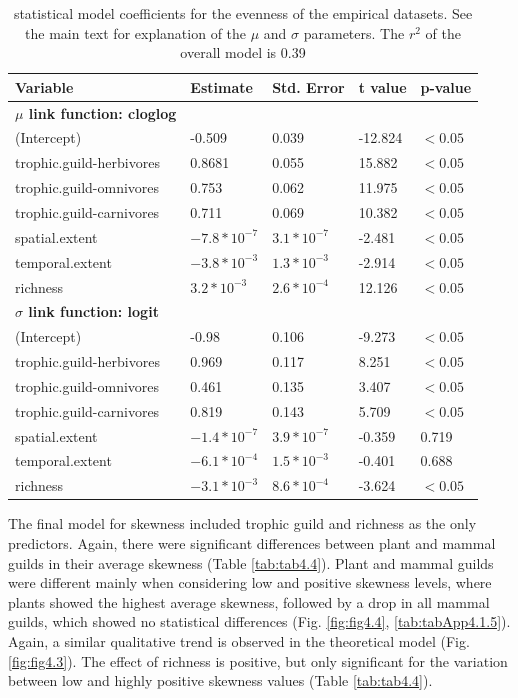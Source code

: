 \begin{table}[htbp!]
\centering
\caption[Evenness model coefficients]{\color{Gray} statistical model coefficients for the evenness of the empirical datasets. See the main text for explanation of the $\mu$ and $\sigma$ parameters. The $r^2$ of the overall model is 0.39}\label{tab:tab4.3}
\begin{tabular}{lllll}
\hline
Variable & Estimate & Std. Error & t value & p-value \\
\hline
\textbf{$\mu$ link function:  cloglog} & & & &  \\
(Intercept)              & -0.509 & 0.039 & -12.824 & $<0.05$ \\
trophic.guild-herbivores   &  0.8681 & 0.055 & 15.882 & $<0.05$ \\
trophic.guild-omnivores    &  0.753 & 0.062 &  11.975 & $<0.05$ \\
trophic.guild-carnivores    &  0.711 & 0.069 & 10.382 & $<0.05$ \\
spatial.extent           & $-7.8*10^{-7}$ & $3.1*10^{-7}$ & -2.481 & $<0.05$ \\
temporal.extent          & $-3.8*10^{-3}$ & $1.3*10^{-3}$ & -2.914 & $<0.05$ \\
richness                 &  $3.2*10^{-3}$ & $2.6*10^{-4}$ & 12.126 & $<0.05$ \\
\hline
\textbf{$\sigma$ link function:  logit} & & & & \\
(Intercept)              & -0.98 & 0.106 & -9.273 & $<0.05$ \\
trophic.guild-herbivores   &  0.969 & 0.117 &  8.251 & $<0.05$ \\
trophic.guild-omnivores    &  0.461 & 0.135 &  3.407 & $<0.05$ \\
trophic.guild-carnivores   &  0.819 & 0.143 &  5.709 & $<0.05$ \\
spatial.extent            &$-1.4*10^{-7}$ & $3.9*10^{-7}$ & -0.359 & 0.719 \\
temporal.extent           &$-6.1*10^{-4}$ & $1.5*10^{-3}$ & -0.401 & 0.688 \\
richness                  &$-3.1*10^{-3}$ & $8.6*10^{-4}$ & -3.624 & $<0.05$ \\
\hline
\end{tabular}

\end{table}

The final model for skewness included trophic guild and richness as the only predictors. Again, there were significant differences between plant and mammal guilds in their average skewness (Table \ref{tab:tab4.4}). Plant and mammal guilds were different mainly when considering low and positive skewness levels, where plants showed the highest average skewness, followed by a drop in all mammal guilds, which showed no statistical differences (Fig. \ref{fig:fig4.4}, \cref{tab:tabApp4.1.5}). Again, a similar qualitative trend is observed in the theoretical model (Fig. \ref{fig:fig4.3}). The effect of richness is positive, but only significant for the variation between low and highly positive skewness values (Table \ref{tab:tab4.4}).

